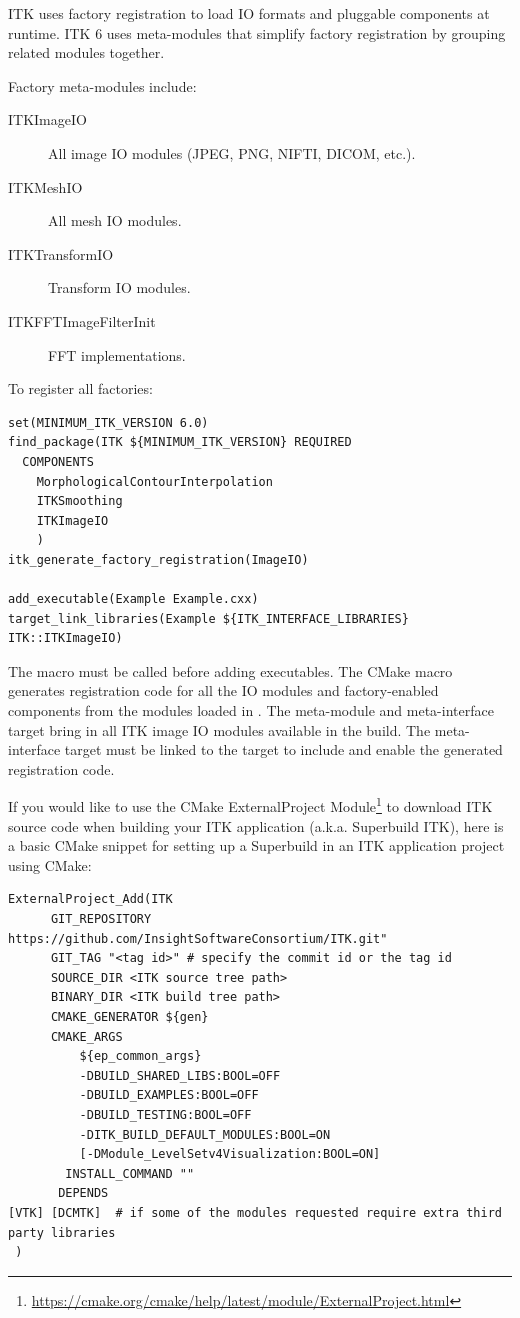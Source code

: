 ITK uses factory registration to load IO formats and pluggable components at runtime.
ITK 6 uses meta-modules that simplify factory registration by grouping related modules together.

Factory meta-modules include:

\begin{description}
  \item[ITKImageIO] All image IO modules (JPEG, PNG, NIFTI, DICOM, etc.).
  \item[ITKMeshIO] All mesh IO modules.
  \item[ITKTransformIO] Transform IO modules.
  \item[ITKFFTImageFilterInit] FFT implementations.
\end{description}

To register all factories:

\small
\begin{verbatim}
set(MINIMUM_ITK_VERSION 6.0)
find_package(ITK ${MINIMUM_ITK_VERSION} REQUIRED
  COMPONENTS
    MorphologicalContourInterpolation
    ITKSmoothing
    ITKImageIO
    )
itk_generate_factory_registration(ImageIO)

add_executable(Example Example.cxx)
target_link_libraries(Example ${ITK_INTERFACE_LIBRARIES} ITK::ITKImageIO)
\end{verbatim}
\normalsize

The  macro must be called before adding executables.
The CMake macro generates registration code for all the IO modules and factory-enabled components from
the modules loaded in . The 
meta-module and  meta-interface target bring in all ITK
image IO modules available in the build. The meta-interface target must be linked to the target to
include and enable the generated registration code.

If you would like to use the CMake ExternalProject
Module\footnote{\url{https://cmake.org/cmake/help/latest/module/ExternalProject.html}}
to download ITK source code when building your ITK application (a.k.a.
Superbuild ITK), here is a basic CMake snippet for setting up a Superbuild in
an ITK application project using CMake:

\small
\begin{verbatim}
ExternalProject_Add(ITK
      GIT_REPOSITORY https://github.com/InsightSoftwareConsortium/ITK.git"
      GIT_TAG "<tag id>" # specify the commit id or the tag id
      SOURCE_DIR <ITK source tree path>
      BINARY_DIR <ITK build tree path>
      CMAKE_GENERATOR ${gen}
      CMAKE_ARGS
          ${ep_common_args}
          -DBUILD_SHARED_LIBS:BOOL=OFF
          -DBUILD_EXAMPLES:BOOL=OFF
          -DBUILD_TESTING:BOOL=OFF
          -DITK_BUILD_DEFAULT_MODULES:BOOL=ON
          [-DModule_LevelSetv4Visualization:BOOL=ON]
        INSTALL_COMMAND ""
       DEPENDS
[VTK] [DCMTK]  # if some of the modules requested require extra third party libraries
 )
\end{verbatim}
\normalsize

